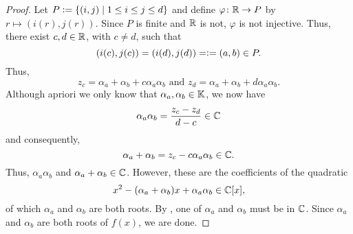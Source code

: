 \begin{proof}
    Let $P \vcentcolon= \left\{ (i,j) \mid 1 \leq i \leq j \leq d \right\}$ and define $\varphi \colon \mathbb{R} \to P$ by $r \mapsto (i(r), j(r))$. Since $P$ is finite and $\mathbb{R}$ is not, $\varphi$ is not injective. Thus, there exist $c,d \in \mathbb{R}$, with $c \neq d$, such that
    \[
        (i(c), j(c)) = (i(d), j(d)) = \vcentcolon= (a,b) \in P.
    \]
    Thus, 
    \[
        z_c = \alpha_a + \alpha_b + c\alpha_a\alpha_b \text{ and } z_d = \alpha_a + \alpha_b + d\alpha_a\alpha_b.
    \]  
    Although apriori we only know that $\alpha_a, \alpha_b \in \mathbb{K}$, we now have
    \[
        \alpha_a\alpha_b = \frac{z_c - z_d}{d-c} \in \mathbb{C}
    \]
    and consequently,
    \[
        \alpha_a + \alpha_b = z_c - c\alpha_a\alpha_b \in \mathbb{C}.
    \]
    Thus, $\alpha_a\alpha_b$ and $\alpha_a + \alpha_b \in \mathbb{C}$. However, these are the coefficients of the quadratic
    \[
        x^2 - (\alpha_a + \alpha_b)x + \alpha_a\alpha_b \in \mathbb{C}[x],
    \]
    of which $\alpha_a$ and $\alpha_b$ are both roots. By , one of $\alpha_a$ and $\alpha_b$ must be in $\mathbb{C}$. Since $\alpha_a$ and $\alpha_b$ are both roots of $f(x)$, we are done.
\end{proof}
